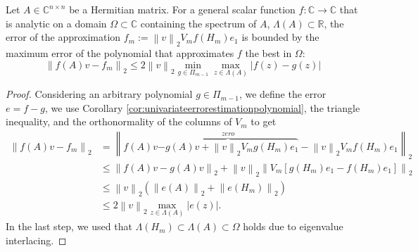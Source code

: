\begin{theorem}
    \label{the:univariateerrorestimationgeneral}
    Let $A \in \mathbb{C}^{n \times n}$ be a Hermitian matrix. For a general scalar function $f: \mathbb{C} \to \mathbb{C}$ that is
    analytic on a domain $\Omega \subset \mathbb{C}$ containing the spectrum of $A$, $\Lambda(A) \subset \mathbb{R}$, the
    error of the approximation $f_m := \left\| v \right\|_{2} V_m f(H_m) e_1$ is bounded by the maximum error of the
    polynomial that approximates $f$ the best in $\Omega$:
    \begin{equation}
        \label{eq:univariateerrorestimationgeneral}
        \left\| f(A)v - f_m \right\|_2 \le 2 \left\| v \right\|_2 \min_{g \in \Pi_{m-1}} \max_{z \in \Lambda(A)} \left|f(z) - g(z) \right|
    \end{equation}
\end{theorem}
\begin{proof}
    Considering an arbitrary polynomial $g \in \Pi_{m-1}$, we define the error $e = f - g$, we use
    Corollary \ref{cor:univariateerrorestimationpolynomial}, the triangle inequality, and the orthonormality of the columns of $V_m$ to get
    \begin{equation*}
        \begin{aligned}
            \left\| f(A)v - f_m \right\|_2
                & = \left\| f(A)v \overset{zero}{\overbrace{- g(A)v + \left\| v \right\|_{2} V_m g(H_m) e_1}}
                - \left\| v \right\|_{2} V_m f(H_m) e_1 \right\|_2 \\
            & \le \left\| f(A)v - g(A)v \right\|_{2}
                + \left\| v \right\|_{2}
                \left\| V_m [g(H_m) e_1 - f(H_m) e_1] \right\|_2\\
            & \le \left\| v \right\|_2 \left( \left\| e(A) \right\|_2 + \left\| e(H_m) \right\|_2 \right)\\
            & \le 2 \left\| v \right\|_2 \max_{z \in \Lambda(A)} \left| e(z) \right|.
            \end{aligned}
    \end{equation*}
    In the last step, we used that $\Lambda(H_m) \subset \Lambda(A) \subset \Omega$ holds due to eigenvalue interlacing.
\end{proof}

